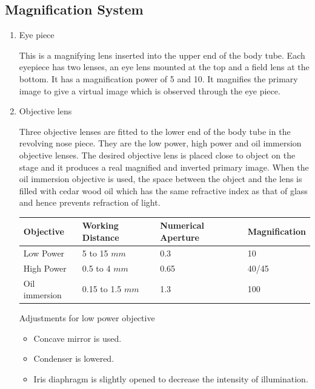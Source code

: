\documentclass[a4paper,12pt,openany,oneside]{book}
\begin{document}
		\subsection*{Magnification System}
		\begin{enumerate}

			\item{Eye piece
				\par This is a magnifying lens inserted into the upper end of the body tube. Each eyepiece has two lenses, an eye lens mounted at the top and a field lens at the bottom. It has a magnification power of 5 and 10. It magnifies the primary image to give a virtual image which is observed through the eye piece.}
			\item{Objective lens

				\par Three objective lenses are fitted to the lower end of the body tube in the revolving nose piece. They are the low power, high power and oil immersion objective lenses. The desired objective lens is placed close to object on the stage and it produces a real magnified and inverted primary image. When the oil immersion objective is used, the space between the object and the lens is filled with cedar wood oil which has the same refractive index as that of glass and hence prevents refraction of light.\newline
				\small{%
					\begin{tabular}{|p{1in} | p{1in} |p{1in} |p{1in} |}
					\hline
					\textbf{Objective} & \textbf{Working Distance} & \textbf{Numerical Aperture} &\textbf{Magnification}\\
					\hline
					Low Power & 5 to 15 $mm$ & 0.3 & 10\\
					\hline
					High Power
					&0.5 to 4 $mm$
					&0.65
					&40/45 \\
					\hline

					Oil immersion
					&0.15 to 1.5 $mm$
					&1.3
					&100 \\

					\hline





				\end{tabular}
				}

				\par
				Adjustments for low power objective
				\begin{itemize}
					\item {Concave mirror is used.}
					\item {Condenser is lowered.}
					\item {Iris diaphragm is slightly opened to decrease the intensity of illumination.}
				\end{itemize}

}
\end{enumerate}
\end{document}
